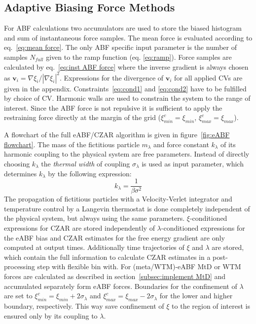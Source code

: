 \subsection{Adaptive Biasing Force Methods}
For ABF calculations two accumulators are used to store the biased histogram and sum of instantaneous force samples. The mean force is evaluated according to eq.~\ref{eq:mean force}.
The only ABF specific input parameter is the number of samples $N_{full}$ given to the ramp function (eq. \ref{eq:ramp}).
Force samples are calculated by eq.~\ref{eq:inst ABF force} where the inverse gradient is always chosen as $\textbf{v}_i = \nabla \xi_i/|\nabla \xi_i|^2$. Expressions for the divergence of $\textbf{v}_i$ for all applied CVs are given in the appendix.
Constraints~\ref{eq:cond1} and \ref{eq:cond2} have to be fulfilled by choice of CV.
Harmonic walls are used to constrain the system to the range of interest.
Since the ABF force is not repulsive it is sufficient to apply the restraining force directly at the margin of the grid ($\xi^c_{min}=\xi_{min}$, $\xi^c_{max}=\xi_{max}$).

A flowchart of the full eABF/CZAR algorithm is given in figure~\ref{fig:eABF flowchart}.
The mass of the fictitious particle $m_\lambda$ and force constant $k_\lambda$ of its harmonic coupling to the physical system are free parameters.
Instead of directly choosing $k_\lambda$ the \textit{thermal width} of coupling $\sigma_\lambda$ is used as input parameter, which determines $k_\lambda$ by the following expression:
\begin{equation}
  k_\lambda = \frac{1}{\beta \sigma^2}
\end{equation}
The propagation of fictitious particles with a Velocity-Verlet\autocite{swope1982computer} integrator and temperature control by a Langevin thermostat\autocite{kroger2005models} is done completely independent of the physical system, but always using the same parameters.
$\xi$-conditioned expressions for CZAR are stored independently of $\lambda$-conditioned expressions for the eABF bias and CZAR estimates for the free energy gradient are only computed at output times.
Additionally time trajectories of $\xi$ and $\lambda$ are stored, which contain the full information to calculate CZAR estimates in a post-processing step with flexible bin with.
For (meta/WTM)-eABF MtD or WTM forces are calculated as described in section~\ref{subsec:implement MtD} and accumulated separately form eABF forces.
Boundaries for the confinement of $\lambda$ are set to $\xi^c_{min}=\xi_{min}+2\sigma_\lambda$ and $\xi^c_{max}=\xi_{max}-2\sigma_\lambda$ for the lower and higher boundary, respectively. This way save confinement of $\xi$ to the region of interest is ensured only by its coupling to $\lambda$.

